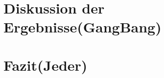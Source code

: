 \documentclass[a4paper, 11pt, oneside]{Thesis}  %
\renewcommand{\bibname}{Literaturverzeichnis}
\begin{document}
\chapter{Diskussion der Ergebnisse(GangBang)} %

\label{chapter:diskussion}

\chapter{Fazit(Jeder)}

\label{chapter:fazit}

\renewcommand{\bibname}{Literaturverzeichnis}

\end{document}
